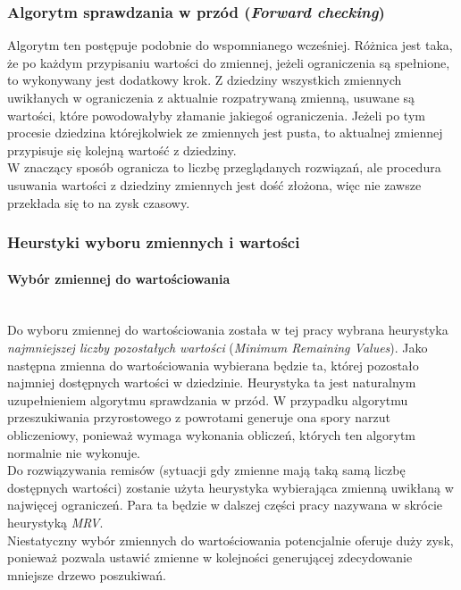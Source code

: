 \documentclass{article}
\begin{document}
	\subsubsection{Algorytm sprawdzania w przód (\textit{Forward checking})}
	Algorytm ten postępuje podobnie do wspomnianego wcześniej. Różnica jest taka, że po każdym przypisaniu wartości do zmiennej, jeżeli ograniczenia są spełnione, to wykonywany jest dodatkowy krok. Z dziedziny wszystkich zmiennych uwikłanych w ograniczenia z aktualnie rozpatrywaną zmienną, usuwane są wartości, które powodowałyby złamanie jakiegoś ograniczenia. Jeżeli po tym procesie dziedzina którejkolwiek ze zmiennych jest pusta, to aktualnej zmiennej przypisuje się kolejną wartość z dziedziny.\\
	W znaczący sposób ogranicza to liczbę przeglądanych rozwiązań, ale procedura usuwania wartości z dziedziny zmiennych jest dość złożona, więc nie zawsze przekłada się to na zysk czasowy. 
	
	\subsubsection{Heurstyki wyboru zmiennych i wartości}\label{sub:heuristics}
	\paragraph{Wybór zmiennej do wartościowania}\mbox{}\\
	Do wyboru zmiennej do wartościowania została w tej pracy wybrana heurystyka \textit{najmniejszej liczby pozostałych wartości} (\textit{Minimum Remaining Values}). Jako następna zmienna do wartościowania wybierana będzie ta, której pozostało najmniej dostępnych wartości w dziedzinie. Heurystyka ta jest naturalnym uzupełnieniem algorytmu sprawdzania w przód. W przypadku algorytmu przeszukiwania przyrostowego z powrotami generuje ona spory narzut obliczeniowy, ponieważ wymaga wykonania obliczeń, których ten algorytm normalnie nie wykonuje.\\
	Do rozwiązywania remisów (sytuacji gdy zmienne mają taką samą liczbę dostępnych wartości) zostanie użyta heurystyka wybierająca zmienną uwikłaną w najwięcej ograniczeń. Para ta będzie w dalszej części pracy nazywana w skrócie heurystyką \textit{MRV}.\\
	Niestatyczny wybór zmiennych do wartościowania potencjalnie oferuje duży zysk, ponieważ pozwala ustawić zmienne w kolejności generującej zdecydowanie mniejsze drzewo poszukiwań.
\end{document}
